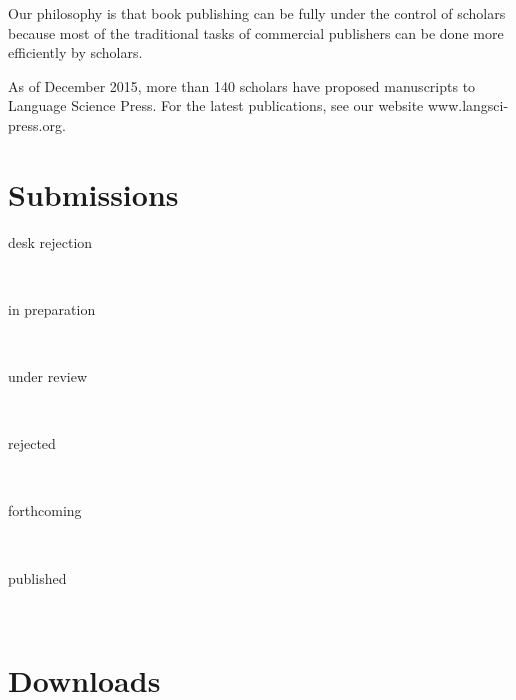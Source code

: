 \documentclass[
notumble,
nofoldmark,
]{leaflet}
\begin{document}
 Our philosophy is that book publishing can be fully under the control of scholars because most of the traditional tasks of commercial publishers can be done more efficiently by scholars. 
 
As of December 2015, more than 140 scholars have proposed manuscripts to Language Science Press. For the latest publications, see our website www.langsci-press.org. 
   
\newpage 
\newlength{\submissionfactor}
\setlength{\submissionfactor}{.5mm}
\newcommand{\submission}[3]{
\parbox[m][.1cm][c]{2.5cm}{\color{LIGHTGRAY} #1}\colorbox{#2}{\parbox[m][.3cm][c]{#3\submissionfactor}{\bfseries\sffamily #3}}\\ 
}

\section{\sffamily\Large\bfseries Submissions}
\submission{desk rejection}{lsRed}{28}
\submission{in preparation}{lsLightBlue}{118}
\submission{under review}{lsDarkBlue}{6}
\submission{rejected}{lsLightOrange}{10}
\submission{forthcoming}{lsSoftGreen}{22}
\submission{published}{lsRichGreen}{27}



 


\section{\sffamily\Large\bfseries Downloads}
\vspace*{-1em}
\parbox[b][0cm][b]{0cm}{
}
\end{document}
